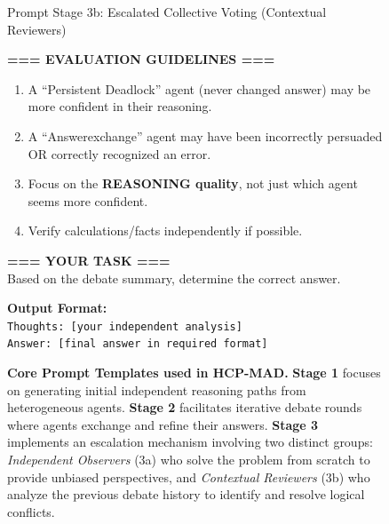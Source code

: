 \documentclass[11pt]{article}
\begin{document}
\begin{figure}[t]
\begin{promptbox}{Prompt Stage 3b: Escalated Collective Voting (Contextual Reviewers)}
        \vspace{2pt}

        \textbf{=== EVALUATION GUIDELINES ===}
        \begin{enumerate}[leftmargin=1.5em]
            \item A ``Persistent Deadlock'' agent (never changed answer) may be more confident in their reasoning.
            \item A ``Answerexchange'' agent may have been incorrectly persuaded OR correctly recognized an error.
            \item Focus on the \textbf{REASONING quality}, not just which agent seems more confident.
            \item Verify calculations/facts independently if possible.
        \end{enumerate}

        \vspace{2pt}

        \textbf{=== YOUR TASK ===} \\
        Based on the debate summary, determine the correct answer.

        \vspace{2pt}

        \textbf{Output Format:} \\
        \texttt{Thoughts: [your independent analysis]} \\
        \texttt{Answer: [final answer in required format]}
    \end{promptbox}

\caption{\textbf{Core Prompt Templates used in HCP-MAD.} \textbf{Stage 1} focuses on generating initial independent reasoning paths from heterogeneous agents. \textbf{Stage 2} facilitates iterative debate rounds where agents exchange and refine their answers. \textbf{Stage 3} implements an escalation mechanism involving two distinct groups: \textit{Independent Observers} (3a) who solve the problem from scratch to provide unbiased perspectives, and \textit{Contextual Reviewers} (3b) who analyze the previous debate history to identify and resolve logical conflicts.}

    \label{fig:all_prompts}
\end{figure}
\end{document}
